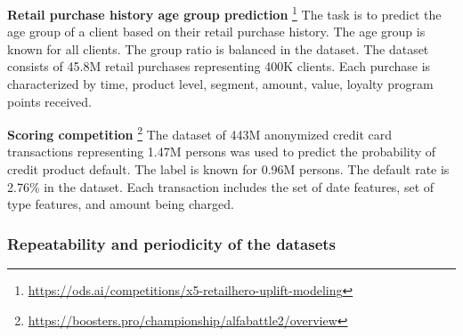 \documentclass[sigconf]{acmart}
\newcommand{\revised}[1]{#1}
\begin{document}
\textbf{Retail purchase history age group prediction}%
\footnote{
    \url{https://ods.ai/competitions/x5-retailhero-uplift-modeling}
}
The task is to predict the age group of a client based on their retail purchase history.
The age group is known for all clients. The group ratio is balanced in the dataset. The dataset consists
of 45.8M retail purchases representing 400K clients. Each purchase is characterized by
time, product level, segment, amount, value, loyalty program points received.

\revised{
\textbf{Scoring competition}%
\footnote{
     \url{https://boosters.pro/championship/alfabattle2/overview}
}
The dataset of 443M an\-onymiz\-ed credit card transactions representing 1.47M persons was
used to predict the probability of credit product default. The label is known for 0.96M
persons. The default rate is 2.76\% in the dataset. Each
transaction includes the set of date features, set of type features, and amount being
charged.
}


\subsubsection{Repeatability and periodicity of the datasets} \label{sec-period}
\end{document}
